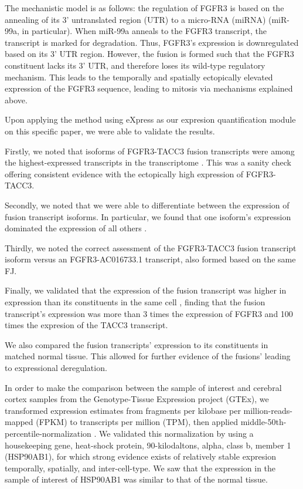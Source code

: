 The mechanistic model is as follows: the regulation of FGFR3 is based on the annealing of its 3' untranslated region (UTR) to a micro-RNA (miRNA) (miR-99a, in particular). When miR-99a anneals to the FGFR3 transcript, the transcript is marked for degradation. Thus, FGFR3's expression is downregulated based on its 3' UTR region. However, the fusion is formed such that the FGFR3 constituent lacks its 3' UTR, and therefore loses its wild-type regulatory mechanism. This leads to the temporally and spatially ectopically elevated expression of the FGFR3 sequence, leading to mitosis via mechanisms explained above.


Upon applying the method using eXpress as our expresion quantification module\cite{roberts_streaming_2013} on this specific paper, we were able to validate the results.

Firstly, we noted that isoforms of FGFR3-TACC3 fusion transcripts were among the highest-expressed transcripts in the transcriptome . This was a sanity check offering consistent evidence with the ectopically high expression of FGFR3-TACC3.


Secondly, we noted that we were able to differentiate between the expression of fusion transcript isoforms. In particular, we found that one isoform's expression dominated the expression of all others .

Thirdly, we noted the correct assessment of the FGFR3-TACC3 fusion transcript isoform versus an FGFR3-AC016733.1 transcript, also formed based on the same FJ.

Finally, we validated that the expression of the fusion transcript was higher in expression than its constituents in the same cell , finding that the fusion transcript's expression was more than 3 times the expression of FGFR3 and 100 times the expresion of the TACC3 transcript.

We also compared the fusion transcripts' expression to its constituents in matched normal tissue. This allowed for further evidence of the fusions' leading to expressional deregulation.

In order to make the comparison between the sample of interest and cerebral cortex samples from the Genotype-Tissue Expression project (GTEx)\cite{lonsdale_genotype-tissue_2013}, we transformed expression estimates from fragments per kilobase per million-reads-mapped (FPKM) to transcripts per million (TPM), then applied middle-50th-percentile-normalization . We validated this normalization by using a housekeeping gene, heat-shock protein, 90-kilodaltons, alpha, class b, member 1 (HSP90AB1), for which strong evidence exists of relatively stable expresion temporally, spatially, and inter-cell-type. We saw that the expression in the sample of interest of HSP90AB1 was similar to that of the normal tissue.

